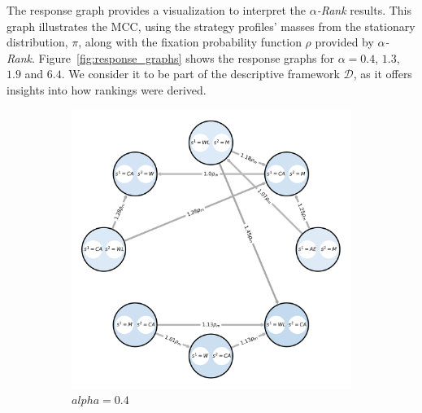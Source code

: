         \noindent
        The response graph provides a visualization to interpret the \emph{$\alpha$-Rank} results. This graph illustrates the MCC, using the strategy profiles' masses from the stationary distribution, $\pi$, along with the fixation probability function $\rho$ provided by \emph{$\alpha$-Rank}. Figure~\ref{fig:response_graphs} shows the response graphs for $\alpha = 0.4$, $1.3$, $1.9$ and $6.4$. We consider it to be part of the descriptive framework $\mathcal{D}$, as it offers insights into how rankings were derived.
        \begin{figure}[H]
            \centering
            \begin{subfigure}[b]{0.45\linewidth}
                \includegraphics[width=\linewidth]{images/rg_0.4.png}
                \caption{$alpha=0.4$}
                \label{fig:response_graph_0.4}
            \end{subfigure}
            \hfill
            \begin{subfigure}[b]{0.45\linewidth}

\end{subfigure}
\end{figure}
